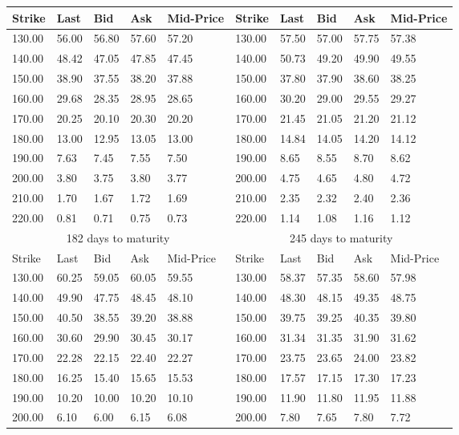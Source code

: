 \documentclass[12pt,a4paper]{report}
\begin{document}
\begin{appendices}
\begin{longtable}{|lllll|lllll|}
    \hline
  Strike & Last & Bid & Ask & Mid-Price & Strike & Last & Bid & Ask & Mid-Price \\
  \hline
  130.00 & 56.00 & 56.80 & 57.60 & 57.20 &  130.00 & 57.50 & 57.00 & 57.75 & 57.38 \\*
  140.00 & 48.42 & 47.05 & 47.85 & 47.45 &  140.00 & 50.73 & 49.20 & 49.90 & 49.55 \\*
  150.00 & 38.90 & 37.55 & 38.20 & 37.88 &  150.00 & 37.80 & 37.90 & 38.60 & 38.25 \\*
  160.00 & 29.68 & 28.35 & 28.95 & 28.65 &  160.00 & 30.20 & 29.00 & 29.55 & 29.27 \\*
  170.00 & 20.25 & 20.10 & 20.30 & 20.20 &  170.00 & 21.45 & 21.05 & 21.20 & 21.12 \\*
  180.00 & 13.00 & 12.95 & 13.05 & 13.00 &  180.00 & 14.84 & 14.05 & 14.20 & 14.12 \\*
  190.00 & 7.63 & 7.45 & 7.55 & 7.50 &  190.00 & 8.65 & 8.55 & 8.70 & 8.62 \\*
  200.00 & 3.80 & 3.75 & 3.80 & 3.77 &  200.00 & 4.75 & 4.65 & 4.80 & 4.72 \\*
  210.00 & 1.70 & 1.67 & 1.72 & 1.69 &  210.00 & 2.35 & 2.32 & 2.40 & 2.36 \\*
  220.00 & 0.81 & 0.71 & 0.75 & 0.73 &  220.00 & 1.14 & 1.08 & 1.16 & 1.12 \\
  \hline
  \multicolumn{5}{|c|}{182 days to maturity} & \multicolumn{5}{c|}{245 days to maturity} \\*
  \hline
  Strike & Last & Bid & Ask & Mid-Price & Strike & Last & Bid & Ask & Mid-Price \\*
  \hline
  130.00 & 60.25 & 59.05 & 60.05 & 59.55 &  130.00 & 58.37 & 57.35 & 58.60 & 57.98 \\*
  140.00 & 49.90 & 47.75 & 48.45 & 48.10 &  140.00 & 48.30 & 48.15 & 49.35 & 48.75 \\*
  150.00 & 40.50 & 38.55 & 39.20 & 38.88 &  150.00 & 39.75 & 39.25 & 40.35 & 39.80 \\*
  160.00 & 30.60 & 29.90 & 30.45 & 30.17 &  160.00 & 31.34 & 31.35 & 31.90 & 31.62 \\*
  170.00 & 22.28 & 22.15 & 22.40 & 22.27 &  170.00 & 23.75 & 23.65 & 24.00 & 23.82 \\*
  180.00 & 16.25 & 15.40 & 15.65 & 15.53 &  180.00 & 17.57 & 17.15 & 17.30 & 17.23 \\*
  190.00 & 10.20 & 10.00 & 10.20 & 10.10 &  190.00 & 11.90 & 11.80 & 11.95 & 11.88 \\*
  200.00 & 6.10 & 6.00 & 6.15 & 6.08 &  200.00 & 7.80 & 7.65 & 7.80 & 7.72 \\*

\end{longtable}
\end{appendices}
\end{document}
